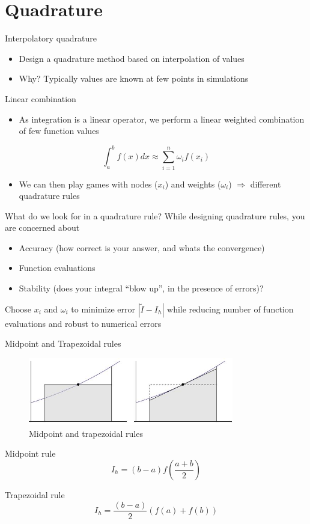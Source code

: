 \documentclass[presentation]{beamer}
\newcommand{\abs}[1]{\left\lvert#1\right\rvert}
\begin{document}
\section{Quadrature}
\label{sec:orgd524e58}
\begin{frame}[label={sec:orgdf37675}]{Interpolatory quadrature}
\begin{itemize}
\item Design a quadrature method based on interpolation of values
\item \alert{Why?} Typically values are known at few points in simulations
\end{itemize}
\begin{block}{Linear combination}
\begin{itemize}
\item As integration is a linear operator, we perform a linear weighted
combination of few function values
\end{itemize}
\[ \int_{a}^{b} f(x) dx \approx \sum_{i=1}^{n} \omega_i f(x_i) \]
\begin{itemize}
\item We can then play games with \alert{nodes} (\(x_i\)) and \alert{weights} (\(\omega_i\))
\(\Rightarrow\) different quadrature rules
\end{itemize}
\end{block}
\end{frame}
\begin{frame}[label={sec:org47a5c6b}]{What do we look for in a quadrature rule?}
While designing quadrature rules, you are concerned about
\begin{itemize}
\item Accuracy (how correct is your answer, and whats the convergence)
\item Function evaluations
\item Stability (does your integral ``blow up'', in the presence of errors)?
\end{itemize}

Choose \(x_i\) and \(\omega_i\) to minimize error \(\abs{\tilde{I} -I_h }\) while reducing number of function evaluations and robust to numerical errors
\end{frame}
\begin{frame}[label={sec:org39b15fa}]{Midpoint and Trapezoidal rules}
\begin{figure}[htbp]
\centering
\includegraphics[width=0.8\textwidth]{images/midpoint.jpg}
\caption{Midpoint and trapezoidal rules}
\end{figure}
\begin{block}{Midpoint rule}
\[ I_h = (b-a) f \left( \frac{a + b}{2} \right) \]
\end{block}
\begin{block}{Trapezoidal rule}
\[ I_h = \frac{(b-a)}{2} \left( f(a) + f(b) \right) \]
\end{block}
\end{frame}
\end{document}
